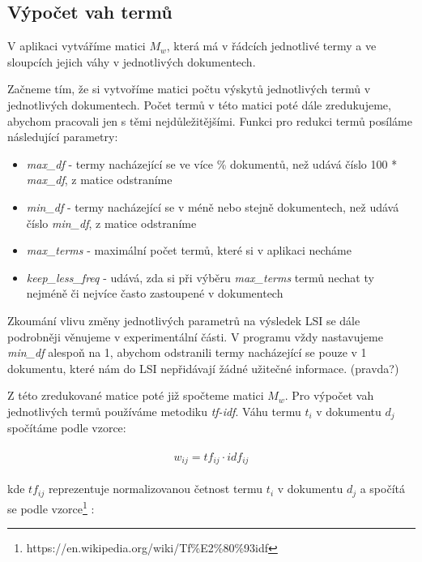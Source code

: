 \documentclass[11pt]{scrartcl} %
\begin{document}
\subsection{Výpočet vah termů}
V aplikaci vytváříme matici $M_w$, která má v řádcích jednotlivé termy a ve sloupcích jejich váhy v jednotlivých dokumentech.

\bigskip 

Začneme tím, že si vytvoříme matici počtu výskytů jednotlivých termů v jednotlivých dokumentech. Počet termů v této matici poté dále zredukujeme, abychom pracovali jen s těmi nejdůležitějšími. Funkci pro redukci termů posíláme následující parametry:
\begin{itemize}
	\item \emph{max\_df} - termy nacházející se ve více \% dokumentů, než udává číslo 100 * \emph{max\_df}, z matice odstraníme
	\item \emph{min\_df} - termy nacházející se v méně nebo stejně dokumentech, než udává číslo \emph{min\_df}, z matice odstraníme
	\item \emph{max\_terms} - maximální počet termů, které si v aplikaci necháme
	\item \emph{keep\_less\_freq} - udává, zda si při výběru \emph{max\_terms} termů nechat ty nejméně či nejvíce často zastoupené v dokumentech  
\end{itemize}

\bigskip 

Zkoumání vlivu změny jednotlivých parametrů na výsledek LSI se dále podrobněji věnujeme v experimentální části. V programu vždy nastavujeme \emph{min\_df} alespoň na 1, abychom odstranili termy nacházející se pouze v 1 dokumentu, které nám do LSI nepřidávají žádné užitečné informace. (pravda?)

\bigskip

Z této zredukované matice poté již spočteme matici $M_w$. Pro výpočet vah jednotlivých termů používáme metodiku \emph{tf-idf}. Váhu termu $t_i$ v dokumentu $d_j$ spočítáme podle vzorce:

\begin{align}
	\begin{split}
		w_{ij} = tf_{ij} \cdot idf_{ij}
	\end{split}					
\end{align}

kde $tf_{ij}$ reprezentuje normalizovanou četnost termu $t_i$ v dokumentu $d_j$ a spočítá se podle vzorce\footnote{https://en.wikipedia.org/wiki/Tf\%E2\%80\%93idf} :
\end{document}
